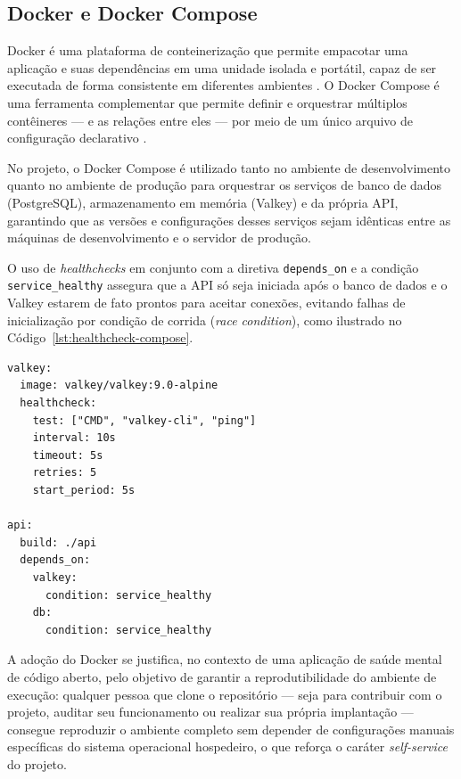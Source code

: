 \subsection{Docker e Docker Compose}

Docker é uma plataforma de conteinerização que permite empacotar uma
aplicação e suas dependências em uma unidade isolada e portátil, capaz de ser
executada de forma consistente em diferentes ambientes \citep{docker:2026}. O
Docker Compose é uma ferramenta complementar que permite definir e orquestrar
múltiplos contêineres --- e as relações entre eles --- por meio de um único
arquivo de configuração declarativo \citep{dockercompose:2026}.

No projeto, o Docker Compose é utilizado tanto no ambiente de desenvolvimento
quanto no ambiente de produção para orquestrar os serviços de banco de dados
(PostgreSQL), armazenamento em memória (Valkey) e da própria API, garantindo
que as versões e configurações desses serviços sejam idênticas entre as
máquinas de desenvolvimento e o servidor de produção.

O uso de \textit{healthchecks} em conjunto com a diretiva
\texttt{depends\_on} e a condição \texttt{service\_healthy} assegura
que a API só seja iniciada após o banco de dados e o Valkey estarem de
fato prontos para aceitar conexões, evitando falhas de inicialização
por condição de corrida (\textit{race condition}), como ilustrado no
Código~\ref{lst:healthcheck-compose}.

\begin{lstlisting}[caption={Configuração do \textit{healthcheck} do Valkey e de dependência condicional da API no \texttt{docker-compose.yml}}, label={lst:healthcheck-compose}]
valkey:
  image: valkey/valkey:9.0-alpine
  healthcheck:
    test: ["CMD", "valkey-cli", "ping"]
    interval: 10s
    timeout: 5s
    retries: 5
    start_period: 5s

api:
  build: ./api
  depends_on:
    valkey:
      condition: service_healthy
    db:
      condition: service_healthy
\end{lstlisting}


A adoção do Docker se justifica, no contexto de uma aplicação de saúde
mental de código aberto, pelo objetivo de garantir a reprodutibilidade do
ambiente de execução: qualquer pessoa que clone o repositório --- seja para
contribuir com o projeto, auditar seu funcionamento ou realizar sua própria
implantação --- consegue reproduzir o ambiente completo sem depender de
configurações manuais específicas do sistema operacional hospedeiro, o que
reforça o caráter \textit{self-service} do projeto.

